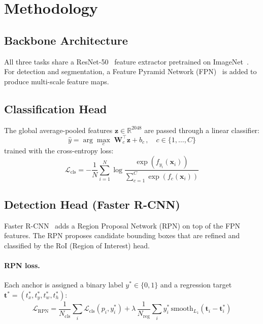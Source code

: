 \documentclass[11pt,a4paper]{article}
\begin{document}
\section{Methodology}
\label{sec:method}

\subsection{Backbone Architecture}

All three tasks share a ResNet-50~\cite{he2016deep} feature extractor
pretrained on ImageNet~\cite{deng2009imagenet}.  For detection and
segmentation, a Feature Pyramid Network (FPN)~\cite{lin2017feature} is added
to produce multi-scale feature maps.

\subsection{Classification Head}

The global average-pooled features $\mathbf{z}\in\mathbb{R}^{2048}$ are
passed through a linear classifier:
\begin{equation}
  \hat{y} = \arg\max_{c}\;\mathbf{W}_c^\top \mathbf{z} + b_c\,,
  \quad c \in \{1,\dots,C\}
  \label{eq:cls}
\end{equation}
trained with the cross-entropy loss:
\begin{equation}
  \mathcal{L}_{\text{cls}} = -\frac{1}{N}\sum_{i=1}^{N}
    \log\frac{\exp(f_{y_i}(\mathbf{x}_i))}
             {\sum_{c=1}^{C}\exp(f_c(\mathbf{x}_i))}
  \label{eq:ce}
\end{equation}

\subsection{Detection Head (Faster R-CNN)}

Faster R-CNN~\cite{ren2015faster} adds a Region Proposal Network (RPN) on
top of the FPN features.  The RPN proposes candidate bounding boxes that are
refined and classified by the RoI (Region of Interest) head.

\paragraph{RPN loss.}  Each anchor is assigned a binary label
$y^*\!\in\{0,1\}$ and a regression target
$\mathbf{t}^*\!=\!(t_x^*,t_y^*,t_w^*,t_h^*)$:
\begin{equation}
  \mathcal{L}_{\text{RPN}} =
    \frac{1}{N_{\text{cls}}}\sum_i \mathcal{L}_{\text{cls}}(p_i, y_i^*)
    + \lambda\,\frac{1}{N_{\text{reg}}}\sum_i y_i^*\,
      \text{smooth}_{L_1}(\mathbf{t}_i - \mathbf{t}_i^*)
  \label{eq:rpn}
\end{equation}
\end{document}
